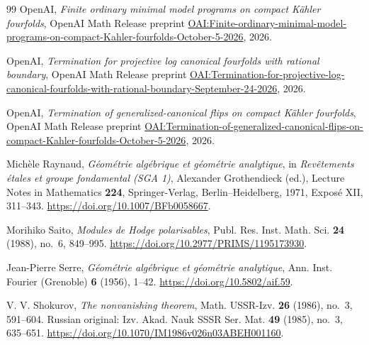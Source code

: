 \begin{thebibliography}{99}
OpenAI,
\emph{Finite ordinary minimal model programs on compact K\"ahler fourfolds},
OpenAI Math Release preprint
\href{https://github.com/openai/math/blob/main/preprints/Finite-ordinary-minimal-model-programs-on-compact-Kahler-fourfolds-October-5-2026/paper.pdf}{OAI:Finite-ordinary-minimal-model-programs-on-compact-Kahler-fourfolds-October-5-2026},
2026.

OpenAI,
\emph{Termination for projective log canonical fourfolds with rational boundary},
OpenAI Math Release preprint
\href{https://github.com/openai/math/blob/main/preprints/Termination-for-projective-log-canonical-fourfolds-with-rational-boundary-September-24-2026/paper.pdf}{OAI:Termination-for-projective-log-canonical-fourfolds-with-rational-boundary-September-24-2026},
2026.

OpenAI,
\emph{Termination of generalized-canonical flips on compact K\"ahler fourfolds},
OpenAI Math Release preprint
\href{https://github.com/openai/math/blob/main/preprints/Termination-of-generalized-canonical-flips-on-compact-Kahler-fourfolds-October-5-2026/termination-generalized-terminal-flips-compact-kahler-fourfolds.pdf}{OAI:Termination-of-generalized-canonical-flips-on-compact-Kahler-fourfolds-October-5-2026},
2026.

Mich\`ele Raynaud,
\emph{G\'eom\'etrie alg\'ebrique et g\'eom\'etrie analytique},
in \emph{Rev\^etements \'etales et groupe fondamental (SGA 1)},
Alexander Grothendieck (ed.), Lecture Notes in Mathematics \textbf{224},
Springer-Verlag, Berlin--Heidelberg, 1971, Expos\'e XII, 311--343.
\url{https://doi.org/10.1007/BFb0058667}.

Morihiko Saito,
\emph{Modules de Hodge polarisables},
Publ. Res. Inst. Math. Sci. \textbf{24} (1988), no.~6, 849--995.
\url{https://doi.org/10.2977/PRIMS/1195173930}.

Jean-Pierre Serre,
\emph{G\'eom\'etrie alg\'ebrique et g\'eom\'etrie analytique},
Ann. Inst. Fourier (Grenoble) \textbf{6} (1956), 1--42.
\url{https://doi.org/10.5802/aif.59}.

V. V. Shokurov,
\emph{The nonvanishing theorem},
Math. USSR-Izv. \textbf{26} (1986), no.~3, 591--604.
Russian original: Izv. Akad. Nauk SSSR Ser. Mat. \textbf{49} (1985),
no.~3, 635--651.
\url{https://doi.org/10.1070/IM1986v026n03ABEH001160}.

\end{thebibliography}
